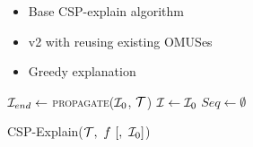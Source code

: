

\begin{itemize}
    \item Base CSP-explain algorithm
    \item v2 with reusing existing OMUSes
    \item Greedy explanation
\end{itemize}


\begin{algorithm*}
      \DontPrintSemicolon
      $\mathcal{I}_{end} \gets$ \textsc{propagate($\mathcal{I}_0$, $\mathcal{T}$)} \;
      $\mathcal{I} \gets \mathcal{I}_0$  \;
      $Seq \gets \emptyset$  \;
    \caption{CSP-Explain($\m{T} ,\ f \ [,  \ \m{I}_0 ]$)}
    \label{alg:cspExplain}
  \end{algorithm*}

